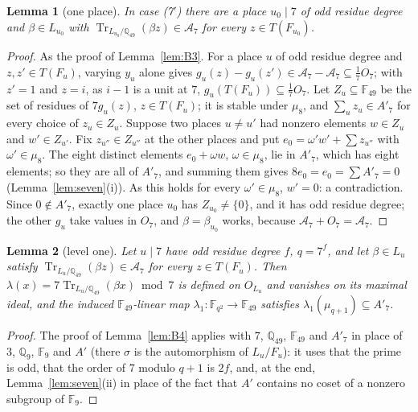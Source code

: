 \documentclass[11pt,a4paper]{amsart}
\newtheorem{lemma}{Lemma}
\theoremstyle{remark}
\newcommand{\Q}{\mathbb{Q}}
\newcommand{\F}{\mathbb{F}}
\newcommand{\Tr}{\operatorname{Tr}}
\newcommand{\cA}{\mathcal{A}}
\begin{document}
\begin{lemma}[one place]\label{lem:B3seven}
In case \textup{(7$'$)} there are a place $u_0\mid7$ of odd residue degree and $\beta\in L_{u_0}$ with
$\Tr_{L_{u_0}/\Q_{49}}(\beta z)\in\cA_7$ for every $z\in T(F_{u_0})$.
\end{lemma}

\begin{proof}
As the proof of Lemma~\ref{lem:B3}. For a place $u$ of odd residue degree and $z,z'\in T(F_u)$, varying $y_u$ alone
gives $g_u(z)-g_u(z')\in\cA_7-\cA_7\subseteq\frac17O_7$; with $z'=1$ and $z=i$, as $i-1$ is a unit at $7$,
$g_u(T(F_u))\subseteq\frac17O_7$. Let $Z_u\subseteq\F_{49}$ be the set of residues of $7g_u(z)$, $z\in T(F_u)$; it is
stable under $\mu_8$, and $\sum_uz_u\in A'_7$ for every choice of $z_u\in Z_u$. Suppose two places $u\ne u'$ had
nonzero elements $w\in Z_u$ and $w'\in Z_{u'}$. Fix $z_{u''}\in Z_{u''}$ at the other places and put
$e_0=\omega'w'+\sum z_{u''}$ with $\omega'\in\mu_8$. The eight distinct elements $e_0+\omega w$, $\omega\in\mu_8$, lie
in $A'_7$, which has eight elements; so they are all of $A'_7$, and summing them gives $8e_0=e_0=\sum A'_7=0$
(Lemma~\ref{lem:seven}(i)). As this holds for every $\omega'\in\mu_8$, $w'=0$: a contradiction. Since $0\notin A'_7$,
exactly one place $u_0$ has $Z_{u_0}\ne\{0\}$, and it has odd residue degree; the other $g_u$ take values in $O_7$,
and $\beta=\beta_{u_0}$ works, because $\cA_7+O_7=\cA_7$.
\end{proof}

\begin{lemma}[level one]\label{lem:B4seven}
Let $u\mid7$ have odd residue degree $f$, $q=7^f$, and let $\beta\in L_u$ satisfy $\Tr_{L_u/\Q_{49}}(\beta
z)\in\cA_7$ for every $z\in T(F_u)$. Then $\lambda(x)=7\Tr_{L_u/\Q_{49}}(\beta x)\bmod7$ is defined on $O_{L_u}$ and
vanishes on its maximal ideal, and the induced $\F_{49}$-linear map $\lambda_1:\F_{q^2}\to\F_{49}$ satisfies
$\lambda_1(\mu_{q+1})\subseteq A'_7$.
\end{lemma}

\begin{proof}
The proof of Lemma~\ref{lem:B4} applies with $7$, $\Q_{49}$, $\F_{49}$ and $A'_7$ in place of $3$, $\Q_9$, $\F_9$ and
$A'$ (there $\sigma$ is the automorphism of $L_u/F_u$): it uses that the prime is odd, that the order of $7$ modulo $q+1$ is $2f$, and, at the end,
Lemma~\ref{lem:seven}(ii) in place of the fact that $A'$ contains no coset of a nonzero subgroup of $\F_9$.
\end{proof}
\end{document}
